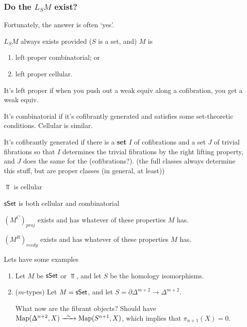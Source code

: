 \documentclass[11pt]{article}
\begin{document}
\begin{AlexandreBousfieldLocalisation}
\begin{PartTwo}
\subsubsection*{Do the $L_SM$ exist?}
Fortunately, the answer is often `yes'.
\begin{thm*}
$L_SM$ always exists provided ($S$ is a set, and) $M$ is
\begin{enumerate}\squishlist
\item left proper combinatorial; or
\item left proper cellular.
\end{enumerate}
\end{thm*}
\begin{defn*}
It's left proper if when you push out a weak equiv along a cofibration, you get a weak equiv.
\end{defn*}
\begin{defn*}
It's combinatorial if it's cofibrantly generated and satisfies some set-theoretic conditions. Cellular is similar.
\end{defn*}
\begin{defn*}
It's cofibrantly generated if there is a \textbf{set} $I$ of cofibrations and a set $J$ of trivial fibrations so that $I$ determines the trivial fibrations by the right lifting property, and $J$ does the same for the (cofibrations?). (the full classes always determine this stuff, but are proper classes (in general, at least))
\end{defn*}
\begin{exmp*}
\begin{itemise}
\item $\Top$ is cellular
\item $\operatorname{{\mathsf{sSet}}}$ is both cellular and combinatorial
\item $(M^C)_{proj}$ exists and has whatever of these properties $M$ has. 
\item $(M^R)_{reedy}$ exists and has whatever of these properties $M$ has.
\end{itemise}
\end{exmp*}
Lets have some examples
\begin{enumerate}
\item Let $M$ be $\operatorname{{\mathsf{sSet}}}$ or $\Top$, and let $S$ be the homology isomorphisms.
\item ($m$-types) Let $M=\operatorname{{\mathsf{sSet}}}$, and let $S=\partial\Delta^{m+2}\to \Delta^{m+2}$.

What now are the fibrant objects? Should have $\Map(\Delta^{n+2},X)\weakequiv\Map(S^{n+1},X)$, which implies that $\pi_{n+1}(X)=0$.


\end{enumerate}
\end{PartTwo}
\end{AlexandreBousfieldLocalisation}
\end{document}

